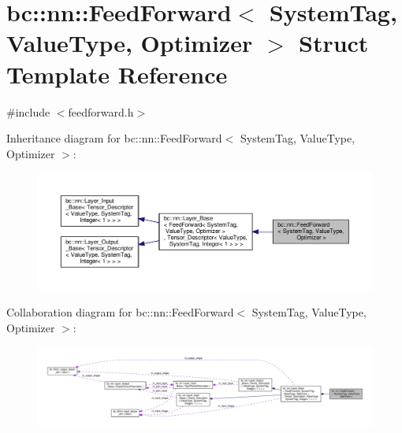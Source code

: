 \hypertarget{structbc_1_1nn_1_1FeedForward}{}\section{bc\+:\+:nn\+:\+:Feed\+Forward$<$ System\+Tag, Value\+Type, Optimizer $>$ Struct Template Reference}
\label{structbc_1_1nn_1_1FeedForward}


{\ttfamily \#include $<$feedforward.\+h$>$}



Inheritance diagram for bc\+:\+:nn\+:\+:Feed\+Forward$<$ System\+Tag, Value\+Type, Optimizer $>$\+:\nopagebreak
\begin{figure}[H]
\begin{center}
\leavevmode
\includegraphics[width=350pt]{structbc_1_1nn_1_1FeedForward__inherit__graph}
\end{center}
\end{figure}


Collaboration diagram for bc\+:\+:nn\+:\+:Feed\+Forward$<$ System\+Tag, Value\+Type, Optimizer $>$\+:\nopagebreak
\begin{figure}[H]
\begin{center}
\leavevmode
\includegraphics[width=350pt]{structbc_1_1nn_1_1FeedForward__coll__graph}
\end{center}
\end{figure}

